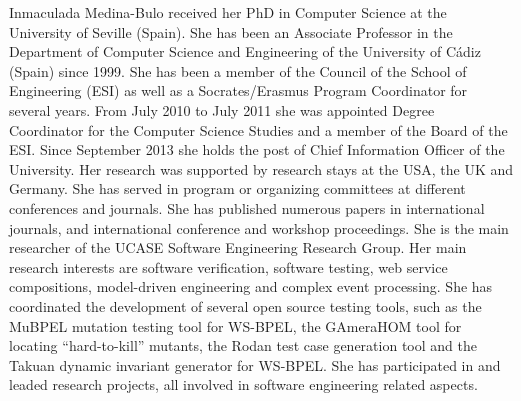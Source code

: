 \documentclass[10pt,journal,compsoc]{IEEEtran}
\begin{document}
\begin{IEEEbiography}{Inmaculada Medina-Bulo}
	  received her PhD in Computer Science at the University of Seville (Spain). She has been an Associate Professor in the Department of Computer Science and Engineering of the University of C\'adiz (Spain) since 1999. She has been a member of the Council of the School of Engineering (ESI) as well as a Socrates/Erasmus Program Coordinator for several years. From July 2010 to July 2011 she was appointed Degree Coordinator for the Computer Science Studies and a member of the Board of the ESI. Since September 2013 she holds the post of Chief Information Officer of the University. Her research was supported by research stays at the USA, the UK and Germany. She has served in program or organizing committees at different conferences and journals. She has published numerous papers in international journals, and international conference and workshop proceedings. She is the main researcher of the UCASE Software Engineering Research Group. Her main research interests are software verification, software testing, web service compositions, model-driven engineering and complex event processing. She has coordinated the development of several open source testing tools, such as the MuBPEL mutation testing tool for WS-BPEL, the GAmeraHOM tool for locating ``hard-to-kill'' mutants, the Rodan test case generation tool and the Takuan dynamic invariant generator for WS-BPEL. She has participated in and leaded research projects, all involved in software engineering related aspects. 
\end{IEEEbiography}









\end{document}
